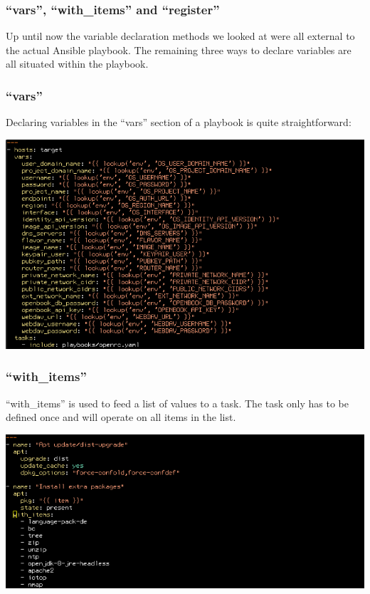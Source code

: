 \documentclass[helvetica,english,utf8,notitle,nologo]{beamer}
\begin{document}
\begin{frame}
  \frametitle{``vars'', ``with\_items'' and ``register''}

  Up until now the variable declaration methods we looked at were all
  external to the actual Ansible playbook. The remaining three ways to
  declare variables are all situated within the playbook.
\end{frame}

\begin{frame}
  \frametitle{``vars''}

  Declaring variables in the ``vars'' section of a playbook is quite
  straightforward:

  \includegraphics[scale=0.34]{img_14}
\end{frame}

\begin{frame}
  \frametitle{``with\_items''}

  ``with\_items'' is used to feed a list of values to a task. The task
  only has to be defined once and will operate on all items in the
  list.

  \includegraphics[scale=0.34]{img_12}
\end{frame}
\end{document}
